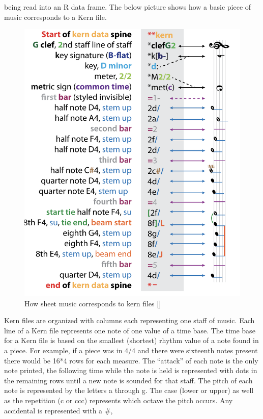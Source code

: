 \documentclass[12pt,twoside]{reedthesis}
\theoremstyle{definition}
\theoremstyle{definition}
\theoremstyle{definition}
\theoremstyle{remark}
\begin{document}
being read into an R data frame. The below picture shows how a basic
piece of music corresponds to a Kern file.
\begin{figure}[h]
\centering
\includegraphics[scale=.50]{images/krnmusic.png}
\caption{How sheet music corresponds to kern files [\cite{huron1994humdrum}]}
\label{subd}
\end{figure}
Kern files are organized with columns each representing one staff of
music. Each line of a Kern file represents one note of one value of a
time base. The time base for a Kern file is based on the smallest
(shortest) rhythm value of a note found in a piece. For example, if a
piece was in 4/4 and there were sixteenth notes present there would be
16*4 rows for each measure. The ``attack'' of each note is the only note
printed, the following time while the note is held is represented with
dots in the remaining rows until a new note is sounded for that staff.
The pitch of each note is represented by the letters a through g. The
case (lower or upper) as well as the repetition (c or ccc) represents
which octave the pitch occurs. Any accidental is represented with a \#,
\end{document}
